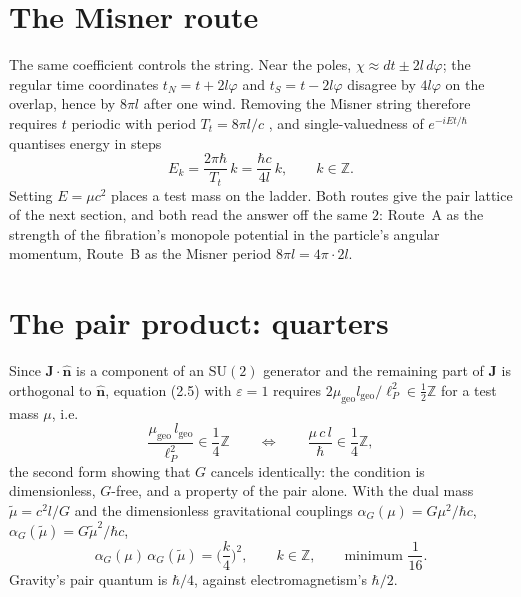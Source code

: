 \documentclass[11pt]{article}
\numberwithin{equation}{section}
\newcommand{\eps}{\varepsilon}
\newcommand{\ZZ}{\mathbb{Z}}
\begin{document}
\section{The Misner route}

The same coefficient controls the string. Near the poles,
$\chi\approx dt\pm2l\,d\varphi$; the regular time coordinates
$t_N=t+2l\varphi$ and $t_S=t-2l\varphi$ disagree by $4l\varphi$ on the
overlap, hence by $8\pi l$ after one wind. Removing the Misner string
therefore requires $t$ periodic with period $T_t=8\pi l/c$ \cite{Misner},
and single-valuedness of $e^{-iEt/\hbar}$ quantises energy in steps
\begin{equation}
E_k=\frac{2\pi\hbar}{T_t}\,k=\frac{\hbar c}{4l}\,k,\qquad k\in\ZZ .
\end{equation}
Setting $E=\mu c^2$ places a test mass on the ladder. Both routes give the
pair lattice of the next section, and both read the answer off the same
$2$: Route~A as the strength of the fibration's monopole potential in the
particle's angular momentum, Route~B as the Misner period $8\pi l=4\pi\cdot2l$.

\section{The pair product: quarters}

Since $\mathbf{J}\cdot\hat{\mathbf{n}}$ is a component of an
$\mathrm{SU}(2)$ generator and the remaining part of $\mathbf{J}$ is
orthogonal to $\hat{\mathbf{n}}$, equation (2.5) with $\eps=1$ requires
$2\mu_{\mathrm{geo}} l_{\mathrm{geo}}/\ell_P^2\in\tfrac12\ZZ$ for a test
mass $\mu$, i.e.
\begin{equation}
\frac{\mu_{\mathrm{geo}}\,l_{\mathrm{geo}}}{\ell_P^2}\in\frac14\ZZ
\qquad\Longleftrightarrow\qquad
\frac{\mu\, c\, l}{\hbar}\in\frac14\ZZ ,
\end{equation}
the second form showing that $G$ cancels identically: the condition is
dimensionless, $G$-free, and a property of the pair alone. With the dual
mass $\tilde\mu=c^2l/G$ and the dimensionless gravitational couplings
$\alpha_G(\mu)=G\mu^2/\hbar c$, $\alpha_G(\tilde\mu)=G\tilde\mu^2/\hbar c$,
\begin{equation}
\boxed{\ \alpha_G(\mu)\,\alpha_G(\tilde\mu)=\Big(\frac{k}{4}\Big)^2,\qquad
k\in\ZZ,\qquad \text{minimum } \frac{1}{16}.\ }
\end{equation}
Gravity's pair quantum is $\hbar/4$, against electromagnetism's $\hbar/2$.
\end{document}
